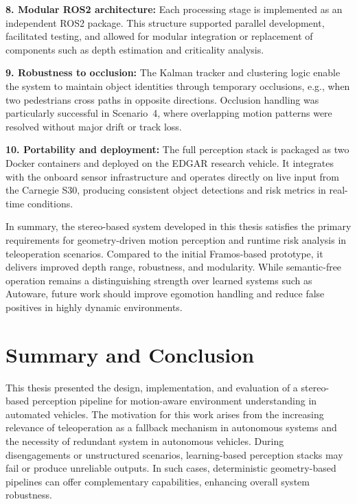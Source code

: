 \textbf{8. Modular ROS2 architecture:} Each processing stage is implemented as
an independent ROS2 package. This structure supported parallel development, facilitated testing,
and allowed for modular integration or replacement of components such as
depth estimation and criticality analysis.

\textbf{9. Robustness to occlusion:} The Kalman tracker and clustering logic
enable the system to maintain object identities through temporary occlusions,
e.g., when two pedestrians cross paths in opposite directions. Occlusion handling
was particularly successful in Scenario~4, where overlapping
motion patterns were resolved without major drift or track loss.

\textbf{10. Portability and deployment:} The full perception stack is packaged
as two Docker containers and deployed on the EDGAR research vehicle. It integrates
with the onboard sensor infrastructure and operates directly on live input
from the Carnegie S30, producing consistent object detections and risk metrics
in real-time conditions.

In summary, the stereo-based system developed in this thesis satisfies the
primary requirements for geometry-driven motion perception and runtime risk
analysis in teleoperation scenarios. Compared to the initial Framos-based
prototype, it delivers improved depth range, robustness, and modularity. While
semantic-free operation remains a distinguishing strength over learned systems
such as Autoware, future work should improve egomotion handling and reduce
false positives in highly dynamic environments.



\chapter{Summary and Conclusion}\label{chap:SummaryAndConclusion}

This thesis presented the design, implementation, and evaluation of a stereo-based 
perception pipeline for motion-aware environment understanding in automated 
vehicles. The motivation for this work arises from the increasing relevance of 
teleoperation as a fallback mechanism in autonomous systems and the necessity of redundant
system in autonomous vehicles. 
During disengagements or unstructured scenarios, learning-based perception stacks may fail or produce 
unreliable outputs. In such cases, deterministic geometry-based pipelines can offer 
complementary capabilities, enhancing overall system robustness.

